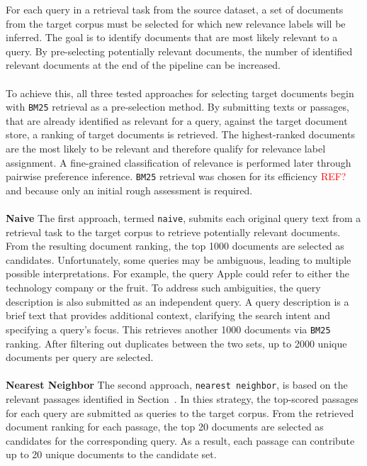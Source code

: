 For each query in a retrieval task from the source dataset, a set of documents from the target corpus must be selected for which new relevance labels will be inferred. The goal is to identify documents that are most likely relevant to a query. By pre-selecting potentially relevant documents, the number of identified relevant documents at the end of the pipeline can be increased.
\\\\
To achieve this, all three tested approaches for selecting target documents begin with \texttt{BM25} retrieval as a pre-selection method. By submitting texts or passages, that are already identified as relevant for a query, against the target document store, a ranking of target documents is retrieved. The highest-ranked documents are the most likely to be relevant and therefore qualify for relevance label assignment. A fine-grained classification of relevance is performed later through pairwise preference inference. \texttt{BM25} retrieval was chosen for its efficiency \textcolor{red}{REF?} and because only an initial rough assessment is required.
\\\\
\textbf{Naive} The first approach, termed \texttt{naive}, submits each original query text from a retrieval task to the target corpus to retrieve potentially relevant documents. From the resulting document ranking, the top 1000 documents are selected as candidates. Unfortunately, some queries may be ambiguous, leading to multiple possible interpretations. For example, the query \glqq Apple\grqq{} could refer to either the technology company or the fruit. To address such ambiguities, the query description is also submitted as an independent query. A query description is a brief text that provides additional context, clarifying the search intent and specifying a query's focus. This retrieves another 1000 documents via \texttt{BM25} ranking. After filtering out duplicates between the two sets, up to 2000 unique documents per query are selected.
\\\\
\textbf{Nearest Neighbor} The second approach, \texttt{nearest neighbor}, is based on the relevant passages identified in Section~. In thies strategy, the top-scored passages for each query are submitted as queries to the target corpus. From the retrieved document ranking for each passage, the top 20 documents are selected as candidates for the corresponding query. As a result, each passage can contribute up to 20 unique documents to the candidate set.
